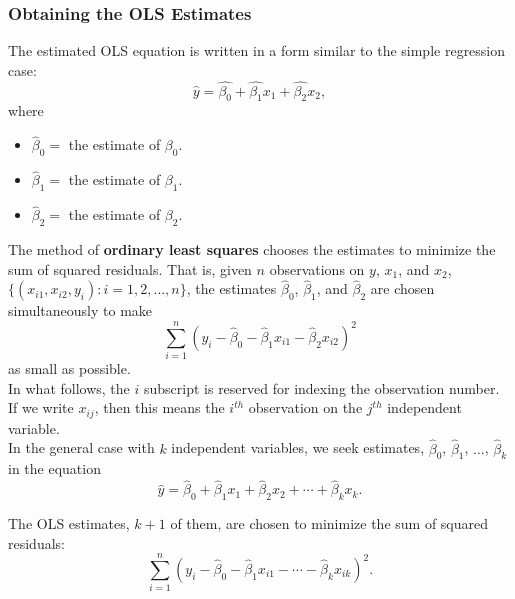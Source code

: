 \documentclass[a4paper, 10pt]{article}
\theoremstyle{definition}	%
\begin{document}
\subsubsection{Obtaining the OLS Estimates}
The estimated OLS equation is written in a form similar to the simple regression case:
\begin{equation}
    \hat{y} = \hat{\beta_0} + \hat{\beta_1}x_1 + \hat{\beta_2}x_2 , \label{eq:p70,3-9}
\end{equation}
where
\begin{itemize}[label={}]
    \item $\hat{\beta}_0 = $ the estimate of $\beta_0$.
    \item $\hat{\beta}_1 = $ the estimate of $\beta_1$.
    \item $\hat{\beta}_2 = $ the estimate of $\beta_2$.
\end{itemize}
The method of \textbf{ordinary least squares} chooses the estimates to minimize the sum of squared residuals. That is, given $n$ observations on $y$, $x_1$, and $x_2$, $\{(x_{i1}, x_{i2}, y_i) : i = 1, 2, \ldots, n\}$, the estimates $\hat{\beta}_0$, $\hat{\beta}_1$, and $\hat{\beta}_2$ are chosen simultaneously to make
\begin{equation}
    \sum_{i=1}^{n} \left( y_i - \hat{\beta}_0 - \hat{\beta}_1 x_{i1} - \hat{\beta}_2 x_{i2} \right)^2
    \label{eq:p70,3-10}
\end{equation}
as small as possible.\\
In what follows, the $i$ subscript is reserved for indexing the observation number. If we write $x_{ij}$, then this means the $i^{th}$ observation on the $j^{th}$ independent variable.\\
In the general case with $k$ independent variables, we seek estimates, $\hat{\beta}_0$, $\hat{\beta}_1$, $\ldots$, $\hat{\beta}_k$ in the equation
\begin{equation}
    \hat{y} = \hat{\beta}_0 + \hat{\beta}_1 x_1 + \hat{\beta}_2 x_2 + \cdots + \hat{\beta}_k x_k.
    \label{eq:p71,3.11}
\end{equation}

The OLS estimates, $k + 1$ of them, are chosen to minimize the sum of squared residuals:
\begin{equation}
    \sum_{i=1}^{n} \left( y_i - \hat{\beta}_0 - \hat{\beta}_1 x_{i1} - \cdots - \hat{\beta}_k x_{ik} \right)^2.
    \label{eq:p70,3.12}
\end{equation}
\end{document}
